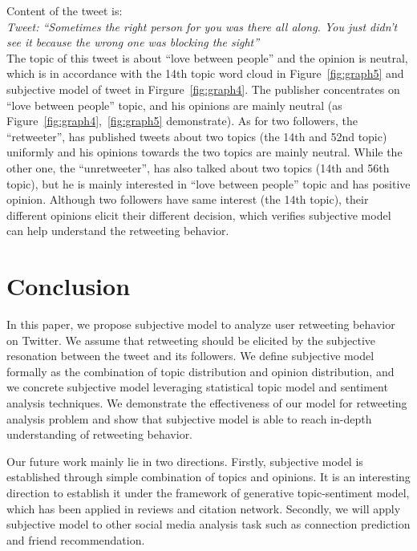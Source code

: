 \documentclass{acm_proc_article-sp}
\begin{document}
Content of the tweet is:\\
\textit{Tweet: ``Sometimes the right person for you was there all along. You just didn’t see it because the wrong one was blocking the sight''} \\
The topic of this tweet is about ``love between people'' and the opinion is neutral, which is in accordance with the 14th topic word cloud in Figure~\ref{fig:graph5} and subjective model of tweet in Firgure~\ref{fig:graph4}.
The publisher concentrates on ``love between people'' topic, and his opinions are mainly neutral (as Figure~\ref{fig:graph4},~\ref{fig:graph5} demonstrate).
As for two followers, the ``retweeter'', has published tweets about two topics (the 14th and 52nd topic) uniformly and his opinions towards the two topics are mainly neutral.
While the other one, the ``unretweeter'', has also talked about two topics (14th and 56th topic), but he is mainly interested in ``love between people'' topic and has positive opinion.
Although two followers have same interest (the 14th topic), their different opinions elicit their different decision, which verifies subjective model can help understand the retweeting behavior.

\section{Conclusion}
In this paper, we propose subjective model to analyze user retweeting behavior on Twitter. We assume that retweeting should be elicited by the subjective resonation between the tweet and its followers. 
We define subjective model formally as the combination of topic distribution and opinion distribution, and we concrete subjective model leveraging statistical topic model and sentiment analysis techniques.
We demonstrate the effectiveness of our model for retweeting analysis problem and show that subjective model is able to reach in-depth understanding of retweeting behavior. 

Our future work mainly lie in two directions.
Firstly, subjective model is established through simple combination of topics and opinions. It is an interesting direction to establish it under the framework of generative topic-sentiment model, which has been applied in reviews and citation network.
Secondly, we will apply subjective model to other social media analysis task such as connection prediction and friend recommendation.


\end{document}

